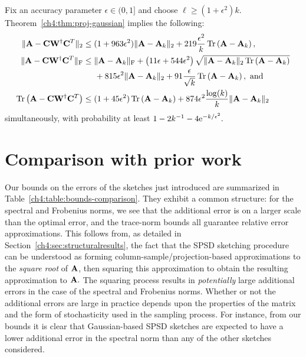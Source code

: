 \begin{description}
 Fix an accuracy parameter $\epsilon \in (0,1]$ and choose $\ell \geq (1 + \epsilon^2) k.$ Theorem~\ref{ch4:thm:proj-gaussian}
 implies the following:
 \begin{align*}
  \|\mathbf{A} - \mathbf{C}\mathbf{W}^\dagger \mathbf{C}^T\|_2 & \leq (1 + 963\epsilon^2)\|\mathbf{A} - \mathbf{A}_k\|_2 
       + 219 \frac{\epsilon^2}{k} \operatorname{Tr}\left(\mathbf{A} - \mathbf{A}_k\right), \\
  \|\mathbf{A} - \mathbf{C}\mathbf{W}^\dagger \mathbf{C}^T\|_{\mathrm{F}} & \leq \|\mathbf{A} - \mathbf{A}_k\|_{\mathrm{F}} + 
     \left( 11\epsilon + 544\epsilon^2\right) \sqrt{\|\mathbf{A} - \mathbf{A}_k\|_2 \operatorname{Tr}\left(\mathbf{A} - \mathbf{A}_k\right)} \\
     &\hspace{5mm} + 815\epsilon^2 \|\mathbf{A} - \mathbf{A}_k\|_2 + 91\frac{\epsilon}{\sqrt{k}} \operatorname{Tr}\left(\mathbf{A} - \mathbf{A}_k\right) , \text{ and} \\
  \operatorname{Tr}\left(\mathbf{A} - \mathbf{C}\mathbf{W}^\dagger \mathbf{C}^T\right) & \leq 
    (1 + 45\epsilon^2)\operatorname{Tr}\left(\mathbf{A} - \mathbf{A}_k\right) 
    + 874 \epsilon^2 \frac{\log(k)}{k} \|\mathbf{A} - \mathbf{A}_k\|_2
 \end{align*}
 simultaneously, with probability at least $1-2k^{-1} - 4\mathrm{e}^{-k/\epsilon^2}.$
\end{description}

\section{Comparison with prior work}
\label{ch4:sec:priorwork}

Our bounds on the errors of the sketches just introduced are summarized in Table~\ref{ch4:table:bounds-comparison}. They
exhibit a common structure: for the spectral and Frobenius
norms, we see that the additional error is on a larger scale than the optimal error, and the trace-norm
bounds all guarantee relative error approximations. This follows from, 
as detailed in Section~\ref{ch4:sec:structuralresults}, the fact that the SPSD sketching procedure can be 
understood as forming column-sample/projection-based approximations to
the \emph{square root} of $\mathbf{A}$, then squaring this approximation to obtain the resulting
approximation to $\mathbf{A}.$ The squaring process results in \emph{potentially} large additional errors
in the case of the spectral and Frobenius norms. Whether or not the additional errors 
are large in practice depends upon the properties of the matrix
and the form of stochasticity used in the sampling process. For instance, from our bounds it is clear that 
Gaussian-based SPSD sketches are expected to have a lower additional error in the spectral norm
than any of the other sketches considered.

